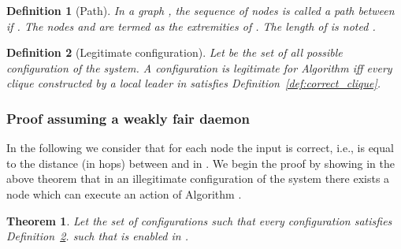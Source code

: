 \documentclass[11pt,letterpaper,onecolumn]{article}
\newtheorem{definition}{Definition}
\newtheorem{theorem}{Theorem}
\begin{document}
\begin{definition}[Path]
In a graph , the sequence of nodes  is called a \emph{path} between  if . The nodes  and  are termed as the \emph{extremities} of . The length of  is noted .
\end{definition}

\begin{definition}[Legitimate configuration]
\label{def:config_legitime}
Let  be the set of all possible configuration of the system. A configuration  is legitimate for Algorithm  iff every clique constructed by a local leader in  satisfies Definition~\ref{def:correct_clique}.
\end{definition}


\subsubsection{Proof assuming a weakly fair daemon}

In the following we consider that for each node  the input  is correct, i.e.,  is equal to the distance (in hops) between  and  in . We begin the proof by showing in the above theorem that in an illegitimate configuration of the system there exists a node which can execute an action of Algorithm .

\begin{theorem}
\label{thm:cmcp_enable_action}
Let the set of configurations  such that every configuration  satisfies Definition~\ref{def:config_legitime}.  such that  is enabled in . 
\end{theorem}
\end{document}
